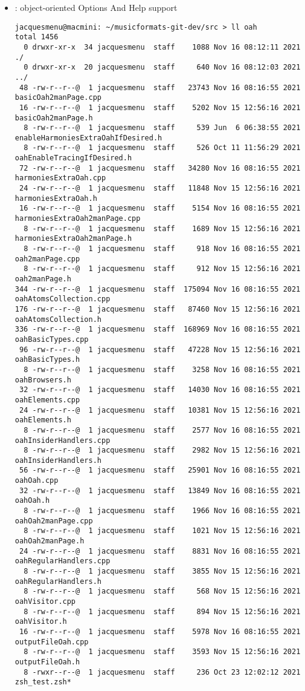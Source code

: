 \begin{itemize}
\item {} : object-oriented Options And Help support
\begin{lstlisting}[language=Terminal]
jacquesmenu@macmini: ~/musicformats-git-dev/src > ll oah
total 1456
  0 drwxr-xr-x  34 jacquesmenu  staff    1088 Nov 16 08:12:11 2021 ./
  0 drwxr-xr-x  20 jacquesmenu  staff     640 Nov 16 08:12:03 2021 ../
 48 -rw-r--r--@  1 jacquesmenu  staff   23743 Nov 16 08:16:55 2021 basicOah2manPage.cpp
 16 -rw-r--r--@  1 jacquesmenu  staff    5202 Nov 15 12:56:16 2021 basicOah2manPage.h
  8 -rw-r--r--@  1 jacquesmenu  staff     539 Jun  6 06:38:55 2021 enableHarmoniesExtraOahIfDesired.h
  8 -rw-r--r--@  1 jacquesmenu  staff     526 Oct 11 11:56:29 2021 oahEnableTracingIfDesired.h
 72 -rw-r--r--@  1 jacquesmenu  staff   34280 Nov 16 08:16:55 2021 harmoniesExtraOah.cpp
 24 -rw-r--r--@  1 jacquesmenu  staff   11848 Nov 15 12:56:16 2021 harmoniesExtraOah.h
 16 -rw-r--r--@  1 jacquesmenu  staff    5154 Nov 16 08:16:55 2021 harmoniesExtraOah2manPage.cpp
  8 -rw-r--r--@  1 jacquesmenu  staff    1689 Nov 15 12:56:16 2021 harmoniesExtraOah2manPage.h
  8 -rw-r--r--@  1 jacquesmenu  staff     918 Nov 16 08:16:55 2021 oah2manPage.cpp
  8 -rw-r--r--@  1 jacquesmenu  staff     912 Nov 15 12:56:16 2021 oah2manPage.h
344 -rw-r--r--@  1 jacquesmenu  staff  175094 Nov 16 08:16:55 2021 oahAtomsCollection.cpp
176 -rw-r--r--@  1 jacquesmenu  staff   87460 Nov 15 12:56:16 2021 oahAtomsCollection.h
336 -rw-r--r--@  1 jacquesmenu  staff  168969 Nov 16 08:16:55 2021 oahBasicTypes.cpp
 96 -rw-r--r--@  1 jacquesmenu  staff   47228 Nov 15 12:56:16 2021 oahBasicTypes.h
  8 -rw-r--r--@  1 jacquesmenu  staff    3258 Nov 16 08:16:55 2021 oahBrowsers.h
 32 -rw-r--r--@  1 jacquesmenu  staff   14030 Nov 16 08:16:55 2021 oahElements.cpp
 24 -rw-r--r--@  1 jacquesmenu  staff   10381 Nov 15 12:56:16 2021 oahElements.h
  8 -rw-r--r--@  1 jacquesmenu  staff    2577 Nov 16 08:16:55 2021 oahInsiderHandlers.cpp
  8 -rw-r--r--@  1 jacquesmenu  staff    2982 Nov 15 12:56:16 2021 oahInsiderHandlers.h
 56 -rw-r--r--@  1 jacquesmenu  staff   25901 Nov 16 08:16:55 2021 oahOah.cpp
 32 -rw-r--r--@  1 jacquesmenu  staff   13849 Nov 16 08:16:55 2021 oahOah.h
  8 -rw-r--r--@  1 jacquesmenu  staff    1966 Nov 16 08:16:55 2021 oahOah2manPage.cpp
  8 -rw-r--r--@  1 jacquesmenu  staff    1021 Nov 15 12:56:16 2021 oahOah2manPage.h
 24 -rw-r--r--@  1 jacquesmenu  staff    8831 Nov 16 08:16:55 2021 oahRegularHandlers.cpp
  8 -rw-r--r--@  1 jacquesmenu  staff    3855 Nov 15 12:56:16 2021 oahRegularHandlers.h
  8 -rw-r--r--@  1 jacquesmenu  staff     568 Nov 15 12:56:16 2021 oahVisitor.cpp
  8 -rw-r--r--@  1 jacquesmenu  staff     894 Nov 15 12:56:16 2021 oahVisitor.h
 16 -rw-r--r--@  1 jacquesmenu  staff    5978 Nov 16 08:16:55 2021 outputFileOah.cpp
  8 -rw-r--r--@  1 jacquesmenu  staff    3593 Nov 15 12:56:16 2021 outputFileOah.h
  8 -rwxr--r--@  1 jacquesmenu  staff     236 Oct 23 12:02:12 2021 zsh_test.zsh*
\end{lstlisting}


\end{itemize}
